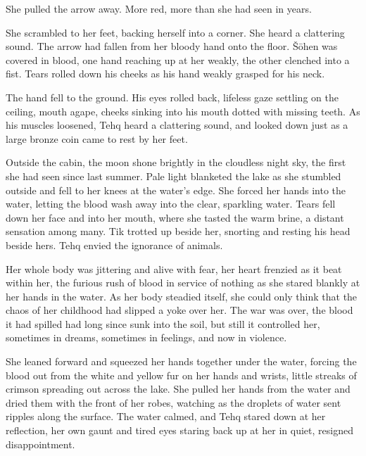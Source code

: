 She pulled the arrow away. More red, more than she had seen in years.

She scrambled to her feet, backing herself into a corner. She heard a clattering sound. The arrow had fallen from her bloody hand onto the floor. Šōhen was covered in blood, one hand reaching up at her weakly, the other clenched into a fist. Tears rolled down his cheeks as his hand weakly grasped for his neck.

The hand fell to the ground. His eyes rolled back, lifeless gaze settling on the ceiling, mouth agape, cheeks sinking into his mouth dotted with missing teeth. As his muscles loosened, Tehq heard a clattering sound, and looked down just as a large bronze coin came to rest by her feet.

Outside the cabin, the moon shone brightly in the cloudless night sky, the first she had seen since last summer. Pale light blanketed the lake as she stumbled outside and fell to her knees at the water's edge. She forced her hands into the water, letting the blood wash away into the clear, sparkling water. Tears fell down her face and into her mouth, where she tasted the warm brine, a distant sensation among many. Tik trotted up beside her, snorting and resting his head beside hers. Tehq envied the ignorance of animals.

Her whole body was jittering and alive with fear, her heart frenzied as it beat within her, the furious rush of blood in service of nothing as she stared blankly at her hands in the water. As her body steadied itself, she could only think that the chaos of her childhood had slipped a yoke over her. The war was over, the blood it had spilled had long since sunk into the soil, but still it controlled her, sometimes in dreams, sometimes in feelings, and now in violence.

She leaned forward and squeezed her hands together under the water, forcing the blood out from the white and yellow fur on her hands and wrists, little streaks of crimson spreading out across the lake. She pulled her hands from the water and dried them with the front of her robes, watching as the droplets of water sent ripples along the surface. The water calmed, and Tehq stared down at her reflection, her own gaunt and tired eyes staring back up at her in quiet, resigned disappointment.
